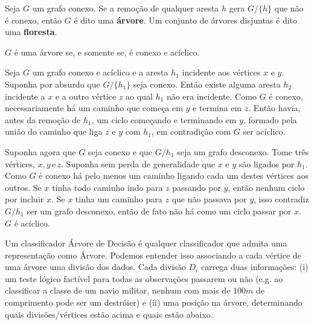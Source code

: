 \begin{defi}
Seja $G$ um grafo conexo. Se a remoção de qualquer aresta $h$ gera $G / \{h\}$ que não é conexo, então $G$ é dito uma \textbf{árvore}. Um conjunto de árvores disjuntas é dito uma \textbf{floresta}.
\end{defi}

\begin{teo}
$G$ é uma árvore se, e somente se, é conexo e acíclico.
\end{teo}

\begin{prova}
Seja $G$ um grafo conexo e acíclico e a aresta $h_1$ incidente aos vértices $x$ e $y$. Suponha por absurdo que $G / \{h_1\}$ seja conexo. Então existe alguma aresta $h_2$ incidente a $x$ e a outro vértice $z$ ao qual $h_1$ não era incidente. Como $G$ é conexo, necessariamente há um caminho que começa em $y$ e termina em $z$. Então havia, antes da remoção de $h_1$, um ciclo começando e terminando em $y$, formado pela união do caminho que liga $z$ e $y$ com $h_1$, em contradição com $G$ ser acíclico.

Suponha agora que $G$ seja conexo e que $G / h_1$ seja um grafo desconexo. Tome três vértices, $x, y \,\text{e}\, z$. Suponha sem perda de generalidade que $x$ e $y$ são ligados por $h_1$. Como $G$ é conexo há pelo menos um caminho ligando cada um destes vértices aos outros. Se $x$ tinha todo caminho indo para $z$ passando por $y$, então nenhum ciclo por incluir $x$. Se $x$ tinha um caminho para $z$ que não passava por $y$, isso contradiz $G / h_1$ ser um grafo desconexo, então de fato não há como um ciclo passar por $x$. $G$ é acíclico. \blacksquare


\end{prova}

Um classificador Árvore de Decisão é qualquer classificador que admita uma representação como Árvore. Podemos entender isso associando a cada vértice de uma árvore uma divisão dos dados. Cada divisão $D_i$ carrega duas informações: (i) um teste lógico factível para todas as observações passarem ou não (e.g. ao classificar a classe de um navio militar, nenhum com mais de $100m$ de comprimento pode ser um destróier) e (ii) uma posição na árvore, determinando quais divisões/vértices estão acima e quais estão abaixo.


